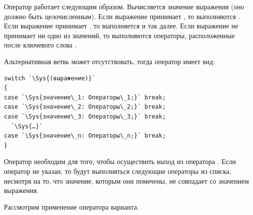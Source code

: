 Оператор работает следующим образом. Вычисляется значение выражения (оно должно быть целочисленным). 
Если выражение принимает
, то выполняются . Если выражение принимает
, то выполняется  и так далее. Если выражение не принимает
ни одно из значений, то выполняются операторы, расположенные после ключевого слова .

Альтернативная ветвь  может отсутствовать, тогда оператор имеет вид:
\begin{lstlisting}
switch `\Sys{(выражение)}`
{
case `\Sys{значение\_1: Операторы\_1;}` break;
case `\Sys{значение\_2: Операторы\_2;}` break;
case `\Sys{значение\_3: Операторы\_3;}` break;
  `\Sys{…}`
case `\Sys{значение\_n: Операторы\_n;}` break;
}
\end{lstlisting}

Оператор  необходим для того, чтобы осуществить выход из оператора .
Если оператор  не указан, то будут выполняться следующие операторы из списка, несмотря на то,
что значение, которым они помечены, не совпадает со значением выражения.

Рассмотрим применение оператора варианта.



